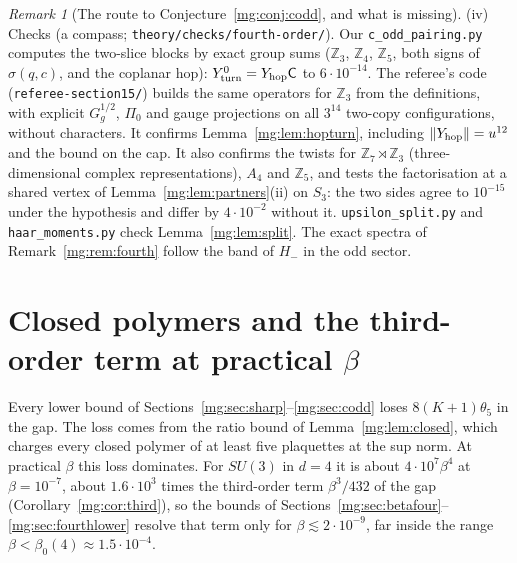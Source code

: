 \documentclass[11pt,a4paper]{article}
\theoremstyle{definition}
\theoremstyle{remark}
\newtheorem{remark}[theorem]{Remark}
\newcommand{\norm}[1]{\lVert #1\rVert}
\begin{document}
\begin{remark}[The route to Conjecture~\ref{mg:conj:codd}, and what is missing]
(iv) Checks (a compass; \texttt{theory/checks/fourth-order/}). Our \texttt{c\_odd\_pairing.py} computes the two-slice blocks by exact group sums ($\mathbb Z_3$, $\mathbb Z_4$,
$\mathbb Z_5$, both signs of $\sigma(q,c)$, and the coplanar hop): $Y^0_{\rm turn}=Y_{\rm hop}\mathsf C$ to $6\cdot10^{-14}$. The referee's code (\texttt{referee-section15/})
builds the same operators for $\mathbb Z_3$ from the definitions, with explicit $G_g^{1/2}$, $\Pi_0$ and gauge projections on all $3^{14}$ two-copy configurations,
without characters. It confirms Lemma~\ref{mg:lem:hopturn}, including $\norm{Y_{\rm hop}}=u^{12}$ and the bound on the cap. It also confirms the twists for $\mathbb Z_7\rtimes\mathbb Z_3$
(three-dimensional complex representations), $A_4$ and $\mathbb Z_5$, and tests the factorisation at a shared vertex of Lemma~\ref{mg:lem:partners}(ii) on $S_3$: the two sides
agree to $10^{-15}$ under the hypothesis and differ by $4\cdot10^{-2}$ without it. \texttt{upsilon\_split.py} and \texttt{haar\_moments.py} check Lemma~\ref{mg:lem:split}. The exact
spectra of Remark~\ref{mg:rem:fourth} follow the band of $H_-$ in the odd sector.
\end{remark}

\section{Closed polymers and the third-order term at practical \texorpdfstring{$\beta$}{beta}}\label{mg:sec:practical}

Every lower bound of Sections~\ref{mg:sec:sharp}--\ref{mg:sec:codd} loses $8(K+1)\theta_5$ in the gap. The loss comes from the ratio bound of Lemma~\ref{mg:lem:closed}, which charges
every closed polymer of at least five plaquettes at the sup norm. At practical $\beta$ this loss dominates. For $SU(3)$ in $d=4$ it is about $4\cdot10^7\beta^4$ at $\beta=10^{-7}$,
about $1.6\cdot10^3$ times the third-order term $\beta^3/432$ of the gap (Corollary~\ref{mg:cor:third}), so the bounds of Sections~\ref{mg:sec:betafour}--\ref{mg:sec:fourthlower}
resolve that term only for $\beta\lesssim2\cdot10^{-9}$, far inside the range $\beta<\beta_0(4)\approx1.5\cdot10^{-4}$.
\end{document}

